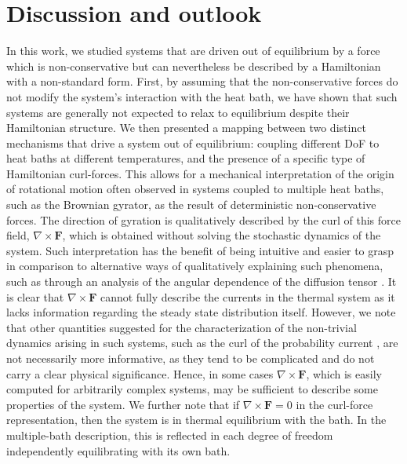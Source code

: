 \section{Discussion and outlook}\label{sec:discussion}
In this work, we studied systems that are driven out of equilibrium by a force which is non-conservative but can nevertheless be described by a Hamiltonian with a non-standard form. First, by assuming that the non-conservative forces do not modify the system's interaction with the heat bath, we have shown that such systems are generally not expected to relax to equilibrium despite their Hamiltonian structure.
We then presented a mapping between two distinct mechanisms that drive a system out of equilibrium: coupling different DoF to heat baths at different temperatures, and the presence of a specific type of Hamiltonian curl-forces. This allows for a mechanical interpretation of the origin of rotational motion often observed in systems coupled to multiple heat baths, such as the Brownian gyrator, as the result of deterministic non-conservative forces. The direction of gyration is qualitatively described by the curl of this force field, $\nabla\times\mathbf{F}$, which is obtained without solving the stochastic dynamics of the system. Such interpretation has the benefit of being intuitive and easier to grasp in comparison to alternative ways of qualitatively explaining such phenomena, such as through an analysis of the angular dependence of the diffusion tensor \cite{abdoli2025quadrupolar}. It is clear that $\nabla\times\mathbf{F}$ cannot fully describe the currents in the thermal system as it lacks information regarding the steady state distribution itself. However, we note that other quantities suggested for the characterization of the non-trivial dynamics arising in such systems, such as the curl of the probability current \cite{dotsenko2013two}, are not necessarily more informative, as they tend to be complicated and do not carry a clear physical significance. Hence, in some cases $\nabla \times \mathbf{F}$, which is easily computed for arbitrarily complex systems, may be sufficient to describe some properties of the system. We further note that if $\nabla \times \mathbf{F} = 0$ in the curl-force representation, then the system is in thermal equilibrium with the bath. In the multiple-bath description, this is reflected in each degree of freedom independently equilibrating with its own bath.

